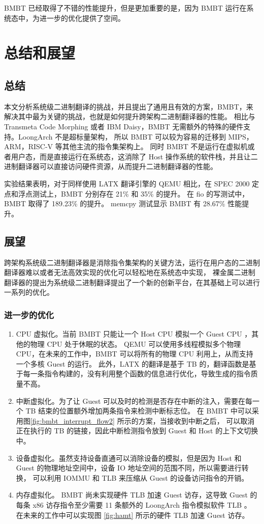 BMBT 已经取得了不错的性能提升，但是更加重要的是，因为 BMBT 运行在系统态中，为进一步的优化提供了空间。

\chapter{总结和展望}\label{chap:future}

\section{总结}
本文分析系统级二进制翻译的挑战，并且提出了通用且有效的方案，BMBT，来解决其中最为关键的挑战，也就是如何提升跨架构二进制翻译器的性能。
相比与 Transmeta Code Morphing 或者 IBM Daisy，BMBT 无需额外的特殊的硬件支持。LoongArch 不是超标量架构，
所以 BMBT 可以较为容易的迁移到 MIPS，ARM，RISC-V 等其他主流的指令集架构上。
同时 BMBT 不是运行在虚拟机或者用户态，而是直接运行在系统态，这消除了 Host 操作系统的软件栈，并且让二进制翻译器可以直接访问硬件资源，从而提升二进制翻译器的性能。

实验结果表明，对于同样使用 LATX 翻译引擎的 QEMU 相比，在 SPEC 2000 定点和浮点测试上，BMBT 分别存在 21\% 和 35\% 的提升。
在 fio 的写测试中，BMBT 取得了 189.23\% 的提升。
memcpy 测试显示 BMBT 有 28.67\% 性能提升。

\section{展望}
跨架构系统级二进制翻译器是消除指令集架构的关键方法，运行在用户态的二进制翻译器难以或者无法高效实现的优化可以轻松地在系统态中实现，
裸金属二进制翻译器的提出为系统级二进制翻译提出了一个新的创新平台，在其基础上可以进行一系列的优化。

\subsection{进一步的优化}
\begin{enumerate}
	\item CPU 虚拟化。当前 BMBT 只能让一个 Host CPU 模拟一个 Guest CPU ，其他的物理 CPU 处于休眠的状态。
	      QEMU 可以使用多线程模拟多个物理 CPU\citep{cota2017cross}，在未来的工作中，BMBT 可以将所有的物理 CPU 利用上，从而支持一个多核 Guest 的运行。
	      此外，LATX 的翻译是基于 TB 的，翻译函数是基于每一条指令构建的，没有利用整个函数的信息进行优化，导致生成的指令质量不高。
	\item 中断虚拟化。为了让 Guest 可以及时的检测是否存在中断的注入，需要在每一个 TB 结束的位置额外增加两条指令来检测中断标志位。
	      在 BMBT 中可以采用图\ref{fig:bmbt_interrupt_flow2} 所示的方案，当接收到中断之后，
	      可以取消正在执行的 TB 的链接，因此中断检测指令放到 Guest 和 Host 的上下文切换中。
	\item 设备虚拟化。虽然支持设备直通可以消除设备的模拟，但是因为 Host 和 Guest 的物理地址空间中，设备 IO 地址空间的范围不同，所以需要进行转换，
		可以利用 IOMMU 和 TLB 来压缩从 Guest 的设备访问指令的开销。
	\item 内存虚拟化。 BMBT 尚未实现硬件 TLB 加速 Guest 访存，这导致 Guest 的每条 x86 访存指令至少需要 11 条额外的 LoongArch 指令模拟软件 TLB 。
		在未来的工作中可以实现图 \ref{fig:hamt} 所示的硬件 TLB 加速 Guest 访存。
\end{enumerate}

